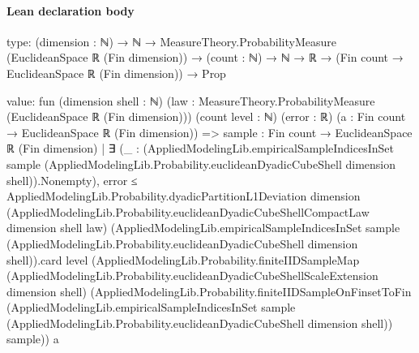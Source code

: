 \documentclass[10pt]{article}
\begin{document}
\paragraph{Lean declaration body}
\begin{ReviewVerbatim}
type:
(dimension : ℕ) →
  ℕ →
    MeasureTheory.ProbabilityMeasure (EuclideanSpace ℝ (Fin dimension)) →
      (count : ℕ) → ℕ → ℝ → (Fin count → EuclideanSpace ℝ (Fin dimension)) → Prop

value:
fun (dimension shell : ℕ) (law : MeasureTheory.ProbabilityMeasure (EuclideanSpace ℝ (Fin dimension))) (count level : ℕ)
    (error : ℝ) (a : Fin count → EuclideanSpace ℝ (Fin dimension)) =>
  {sample : Fin count → EuclideanSpace ℝ (Fin dimension) |
      ∃ (_ :
        (AppliedModelingLib.empiricalSampleIndicesInSet sample
            (AppliedModelingLib.Probability.euclideanDyadicCubeShell dimension shell)).Nonempty),
        error ≤
          AppliedModelingLib.Probability.dyadicPartitionL1Deviation dimension
            (AppliedModelingLib.Probability.euclideanDyadicCubeShellCompactLaw dimension shell law)
            (AppliedModelingLib.empiricalSampleIndicesInSet sample
                (AppliedModelingLib.Probability.euclideanDyadicCubeShell dimension shell)).card
            level
            (AppliedModelingLib.Probability.finiteIIDSampleMap
              (AppliedModelingLib.Probability.euclideanDyadicCubeShellScaleExtension dimension shell)
              (AppliedModelingLib.Probability.finiteIIDSampleOnFinsetToFin
                (AppliedModelingLib.empiricalSampleIndicesInSet sample
                  (AppliedModelingLib.Probability.euclideanDyadicCubeShell dimension shell))
                sample))}
    a
\end{ReviewVerbatim}
\end{document}
